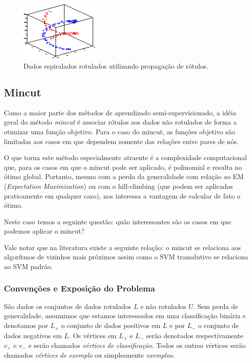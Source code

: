\documentclass[12pt]{article}
\begin{document}
\begin{figure}[!h] \label{fig:horizontal23}
        \begin{center}
                \includegraphics[width=0.35\textwidth]{prop2-dados-rotu}
        \end{center}
        \caption{Dados espiralados rotulados utilizando propagação de rótulos.}
\end{figure}

\subsection{Mincut}
Como a maior parte dos métodos de aprendizado semi-supervisionado, a idéia geral do método \emph{mincut} é associar rótulos aos dados não rotulados de forma a otimizar uma função objetivo. Para o caso do mincut, as funções objetivo são limitadas aos casos em que dependem somente das relações entre pares de nós.

O que torna este método especialmente atraente é a complexidade computacional que, para os casos em que o mincut pode ser aplicado, é polinomial e resulta no ótimo global. Portanto, mesmo com a perda da generalidade com relação ao EM (\emph{Expectation Maximization}) ou com o hill-climbing (que podem ser aplicados praticamente em qualquer caso), nos interessa a vantagem de calcular de fato o ótimo.

Neste caso temos a seguinte questão: quão interessantes são os casos em que podemos aplicar o mincut?

Vale notar que na literatura existe a seguinte relação: o mincut se relaciona aos algorítmos de vizinhos mais próximos assim como o SVM transdutivo se relaciona ao SVM padrão.

\subsubsection{Convenções e Exposição do Problema}
São dados os conjuntos de dados rotulados $L$ e não rotulados $U$. Sem perda de generalidade, assumimos que estamos interessados em uma classificação binária e denotamos por $L_+$ o conjunto de dados positivos em $L$ e por $L_-$ o conjunto de dados negativos em $L$. Os vértices em $L_+$ e $L_-$ serão denotados respectivamente $v_+$ e $v_-$ e serão chamados \emph{vértices de classificação}. Todos os outrso vértices serão chamados \emph{vértices de exemplo} ou simplesmente \emph{exemplos}.
\end{document}
